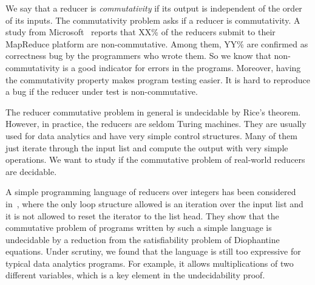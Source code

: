 \documentclass[runningheads,a4paper]{llncs}
\newcommand{\hide}[1]{}
\begin{document}
We say that a reducer is \emph{commutativity} if its output is independent of the order of its inputs. The commutativity problem asks if a reducer is commutativity. A study from Microsoft~\cite{XZZ+14} reports that XX\% of the reducers submit to their MapReduce platform are non-commutative. Among them, YY\% are confirmed as correctness bug by the programmers who wrote them. So we know that non-commutativity is a good indicator for errors in the programs. 
Moreover, having the commutativity property makes program testing easier. It is hard to reproduce a bug if the reducer under test is non-commutative. 

The reducer commutative problem in general is undecidable by Rice's theorem. However, in practice, the reducers are seldom Turing machines. They are usually used for data analytics and have very simple control structures. Many of them just iterate through the input list and compute the output with very simple operations.
We want to study if the commutative problem of real-world reducers are decidable.

A simple programming language of reducers over integers has been considered in~\cite{CHSW15}, where the only loop structure allowed is an iteration over the input list and it is not allowed to reset the iterator to the list head. They show that the commutative problem of programs written by such a simple language is undecidable by a reduction from the satisfiability problem of Diophantine equations. Under scrutiny, we found that the language is still too expressive for typical data analytics programs. For example, it allows multiplications of two different variables, which is a key element in the undecidability proof. 
\hide{
\begin{figure}
	\centering
	\begin{tabular}{rcl}
		$c \in \mathbb{Z}$&&\\	
		$v \in Var$&$\equiv$&$x \mid y \mid z \mid cur()\mid \ldots$\\
		$g \in Guard$&$\equiv$&$cur() > v \mid cur()= v \mid v>c \mid v=c \mid \neg g \mid g\wedge g$\\
		$e \in Expressions$&$\equiv$&$c\mid v \mid e+e \mid e\times e \mid e - e$\\
		$ s \in Statements$&$\equiv$&$v := e\mid s;s\mid \mbox{if(} g \mbox{)then\{} s;\mbox{\}else\{}s;\mbox{\}}\mid \mbox{return }e\mid $\\
		&&$\mbox{while(}cur()\neq end() \mbox{)\{} s;\mbox{\}}\mid next()$		
	\end{tabular}
	\label{fig:language}
	\caption{A Simple Programming Language for Reducers}
\end{figure}
}
\end{document}
